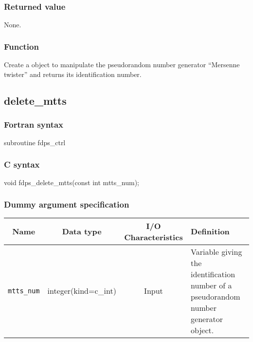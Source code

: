 \subsubsection*{Returned value}
None.

\subsubsection*{Function}
Create a object to manipulate the pseudorandom number generator ``Mersenne twister'' and returns its identification number.
\clearpage

\subsection{delete\_mtts}
\subsubsection*{Fortran syntax}
\begin{screen}
\begin{spverbatim}  
subroutine fdps_ctrl%
\end{spverbatim}
\end{screen}

\subsubsection*{C syntax}
\begin{screen}
\begin{spverbatim}
void fdps_delete_mtts(const int mtts_num);
\end{spverbatim}
\end{screen}

\subsubsection*{Dummy argument specification}
\begin{table}[h]
\begin{tabularx}{\linewidth}{cccX}
\toprule
\rowcolor{Snow2}
Name & Data type & I/O Characteristics & Definition \\
\midrule
\verb|mtts_num| & integer(kind=c\_int) & Input & Variable giving the identification number of a pseudorandom number generator object.\\
\bottomrule
\end{tabularx}
\end{table}

